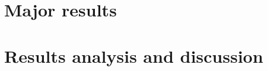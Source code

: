 

\section{Major results}
    \label{sec:major_res}
    

\section{Results analysis and discussion}
    \label{sec:res_analysis_discuss}
    